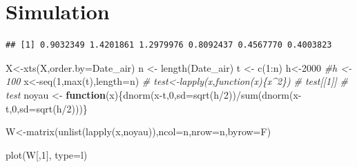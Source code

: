\documentclass[
]{article}
\newenvironment{Shaded}{\begin{snugshade}}{\end{snugshade}}
\newcommand{\AttributeTok}[1]{\textcolor[rgb]{0.77,0.63,0.00}{#1}}
\newcommand{\CommentTok}[1]{\textcolor[rgb]{0.56,0.35,0.01}{\textit{#1}}}
\newcommand{\ControlFlowTok}[1]{\textcolor[rgb]{0.13,0.29,0.53}{\textbf{#1}}}
\newcommand{\DecValTok}[1]{\textcolor[rgb]{0.00,0.00,0.81}{#1}}
\newcommand{\FunctionTok}[1]{\textcolor[rgb]{0.00,0.00,0.00}{#1}}
\newcommand{\NormalTok}[1]{#1}
\newcommand{\OtherTok}[1]{\textcolor[rgb]{0.56,0.35,0.01}{#1}}
\newcommand{\SpecialCharTok}[1]{\textcolor[rgb]{0.00,0.00,0.00}{#1}}
\newcommand{\StringTok}[1]{\textcolor[rgb]{0.31,0.60,0.02}{#1}}
\begin{document}
\hypertarget{simulation}{%
\section{Simulation}\label{simulation}}

\begin{Shaded}
\end{Shaded}

\begin{verbatim}
## [1] 0.9032349 1.4201861 1.2979976 0.8092437 0.4567770 0.4003823
\end{verbatim}

\begin{Shaded}
\begin{Highlighting}[]
\NormalTok{X}\OtherTok{\textless{}{-}}\FunctionTok{xts}\NormalTok{(X,}\AttributeTok{order.by=}\NormalTok{Date\_air)}
\NormalTok{n }\OtherTok{\textless{}{-}} \FunctionTok{length}\NormalTok{(Date\_air)}
\NormalTok{t }\OtherTok{\textless{}{-}} \FunctionTok{c}\NormalTok{(}\DecValTok{1}\SpecialCharTok{:}\NormalTok{n)}
\NormalTok{h}\OtherTok{\textless{}{-}}\DecValTok{2000}
\CommentTok{\#h \textless{}{-} 100}
\NormalTok{x}\OtherTok{\textless{}{-}}\FunctionTok{seq}\NormalTok{(}\DecValTok{1}\NormalTok{,}\FunctionTok{max}\NormalTok{(t),}\AttributeTok{length=}\NormalTok{n)}
\CommentTok{\# test\textless{}{-}lapply(x,function(x)\{x\^{}2\})}
\CommentTok{\# test[[1]]}
\CommentTok{\# test}
\NormalTok{noyau }\OtherTok{\textless{}{-}} \ControlFlowTok{function}\NormalTok{(x)\{}\FunctionTok{dnorm}\NormalTok{(x}\SpecialCharTok{{-}}\NormalTok{t,}\DecValTok{0}\NormalTok{,}\AttributeTok{sd=}\FunctionTok{sqrt}\NormalTok{(h}\SpecialCharTok{/}\DecValTok{2}\NormalTok{))}\SpecialCharTok{/}\FunctionTok{sum}\NormalTok{(}\FunctionTok{dnorm}\NormalTok{(x}\SpecialCharTok{{-}}\NormalTok{t,}\DecValTok{0}\NormalTok{,}\AttributeTok{sd=}\FunctionTok{sqrt}\NormalTok{(h}\SpecialCharTok{/}\DecValTok{2}\NormalTok{)))\}}

\NormalTok{W}\OtherTok{\textless{}{-}}\FunctionTok{matrix}\NormalTok{(}\FunctionTok{unlist}\NormalTok{(}\FunctionTok{lapply}\NormalTok{(x,noyau)),}\AttributeTok{ncol=}\NormalTok{n,}\AttributeTok{nrow=}\NormalTok{n,}\AttributeTok{byrow=}\NormalTok{F)}

\FunctionTok{plot}\NormalTok{(W[,}\DecValTok{1}\NormalTok{], }\AttributeTok{type=}\StringTok{\textquotesingle{}l\textquotesingle{}}\NormalTok{)}
\end{Highlighting}
\end{Shaded}
\end{document}
